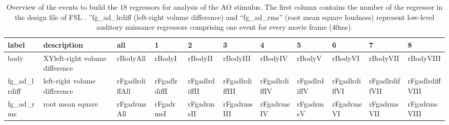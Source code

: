 \documentclass[english]{article}
\begin{document}

\begin{table}[t]
    \caption{Overview of the events to build the 18 regressors for analysis of the AO stimulus. The first column contains the number of the regressor in the design file of FSL \citep{smith2004fsl}.
''fg\_ad\_lrdiff (left-right volume difference) and ``fg\_ad\_rms'' (root mean square loudness) represent low-level auditory nuissance regressors comprising one event for every movie frame (40ms).}
\label{tab:regressors}
\footnotesize
\begin{tabular}{lp{3.5cm}lllllllll}
\toprule
\textbf{label} &  \textbf{description} & \textbf{all} & \textbf{1} & \textbf{2} & \textbf{3} & \textbf{4} & \textbf{5} & \textbf{6} & \textbf{7} & \textbf{8} \\
\midrule
body & XYleft-right volume difference & rBodyAll & rBodyI & rBodyII & rBodyIII & rBodyIV & rBodyV & rBodyVI & rBodyVII & rBodyVIII \tabularnewline







fg\_ad\_lrdiff & left-right volume difference & rFgadlrdiffAll & rFgadlrdiffI & rFgadlrdiffII & rFgadlrdiffIII & rFgadlrdiffIV & rFgadlrdiffV & rFgadlrdiffVI & rFgadlrdiffVII & rFgadlrdiffVIII \tabularnewline
fg\_ad\_rms & root mean square & rFgadrmsAll & rFgadrmsI & rFgadrmsII & rFgadrmsIII & rFgadrmsIV & rFgadrmsV & rFgadrmsVI & rFgadrmsVII & rFgadrmsVIII \tabularnewline
\bottomrule
\end{tabular}
\end{table}
\end{document}
